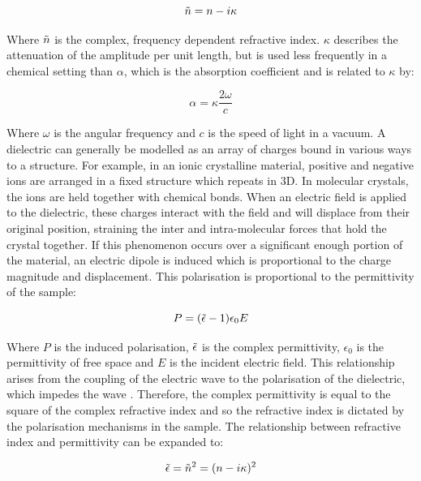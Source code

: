\begin{equation}
\Tilde{n} = n - i\kappa
\end{equation}

Where \(\Tilde{n}\) is the complex, frequency dependent refractive index. \(\kappa\) describes the attenuation of the amplitude per unit length, but is used less frequently in a chemical setting than \(\alpha\), which is the absorption coefficient and is related to \(\kappa\) by:

\begin{equation}
\alpha = \kappa \frac{2\omega}{c}
\label{eqn:abs}
\end{equation}

Where \(\omega\) is the angular frequency and \(c\) is the speed of light in a vacuum. A dielectric can generally be modelled as an array of charges bound in various ways to a structure. For 
example, in an ionic crystalline material, positive and negative ions are arranged in a fixed structure which repeats in 3D. In molecular crystals, the ions are held together with chemical bonds. When an electric field is applied to the dielectric, these charges interact with the field and will displace from their original position, straining the inter and intra\nobreakdash-molecular forces that hold the crystal together. If this phenomenon occurs over a significant enough portion of the material, an electric dipole is induced which is proportional to the charge magnitude and displacement. This polarisation is proportional to the permittivity of the sample:

\begin{equation}
P = (\Tilde{\epsilon}-1) \epsilon_0 E
\end{equation}

Where \(P\) is the induced polarisation, \(\Tilde{\epsilon}\) is the complex permittivity, \(\epsilon_0\) is the permittivity of free space and \(E\) is the incident electric field. This relationship arises from the coupling of the electric wave to the polarisation of the dielectric, which impedes the wave \cite{Kasap2006}. Therefore, the complex permittivity is equal to the square of the complex refractive index and so the refractive index is dictated by the polarisation mechanisms in the sample.  The relationship between refractive index and permittivity can be expanded to:

\begin{equation}
\Tilde{\epsilon} = \Tilde{n}^2 = (n - i\kappa)^2
\end{equation}

